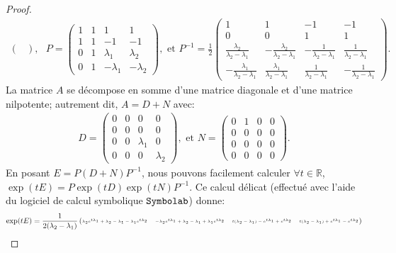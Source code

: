 \begin{proof}
\begin{align*}
\begin{pmatrix}
    \end{pmatrix}, \text{  } P = \begin{pmatrix}
        1 & 1 & 1 & 1 \\ 1 & 1 & -1 & -1 \\ 0 & 1 & \lambda_1 & \lambda_2 \\ 0 & 1 & -\lambda_1 & -\lambda_2
    \end{pmatrix}, \text{ et } P^{-1} = \frac{1}{2}\begin{pmatrix}
        1 & 1 & -1 & -1 \\ 0 & 0 & 1 & 1 \\ \frac{\lambda_2}{\lambda_2-\lambda_1} & -\frac{\lambda_2}{\lambda_2-\lambda_1} & -\frac{1}{\lambda_2-\lambda_1} & \frac{1}{\lambda_2-\lambda_1} \\ -\frac{\lambda_1}{\lambda_2-\lambda_1} & \frac{\lambda_1}{\lambda_2-\lambda_1} & \frac{1}{\lambda_2-\lambda_1} & -\frac{1}{\lambda_2-\lambda_1}
    \end{pmatrix}.
\end{align*}
La matrice $A$ se décompose en somme d'une matrice diagonale et d'une matrice nilpotente; autrement dit, $A = D+N$ avec:
\begin{align*}
    D = \begin{pmatrix}
        0 & 0 & 0 & 0 \\ 0 & 0 & 0 & 0 \\ 0 & 0 & \lambda_1 & 0 \\ 0 & 0 & 0 & \lambda_2
    \end{pmatrix}, \text{ et } N = \begin{pmatrix}
        0 & 1 & 0 & 0 \\ 0 & 0 & 0 & 0 \\ 0 & 0 & 0 & 0 \\ 0 & 0 & 0 & 0
    \end{pmatrix}.
\end{align*}
En posant $E = P(D+N)P^{-1}$, nous pouvons facilement calculer $\forall t \in \mathbb{R}$, $\exp(tE) = P\exp(tD)\exp(tN)P^{-1}$. Ce calcul délicat (effectué avec l'aide du logiciel de calcul symbolique $\verb|Symbolab|$) donne:
\begin{align*}
    \exp(tE) = \tiny \frac{1}{2(\lambda_2 - \lambda_1)}\begin{pmatrix} 
        \lambda_2e^{t\lambda_1} + \lambda_2 - \lambda_1 - \lambda_1e^{t\lambda_2} & -\lambda_2e^{t\lambda_1} + \lambda_2 - \lambda_1 + \lambda_1e^{t\lambda_2} & t(\lambda_2 -\lambda_1) - e^{t\lambda_1} + e^{t\lambda_2} & t(\lambda_2 -\lambda_1) + e^{t\lambda_1} - e^{t\lambda_2} \\

\end{pmatrix}
\end{align*}
\end{proof}
